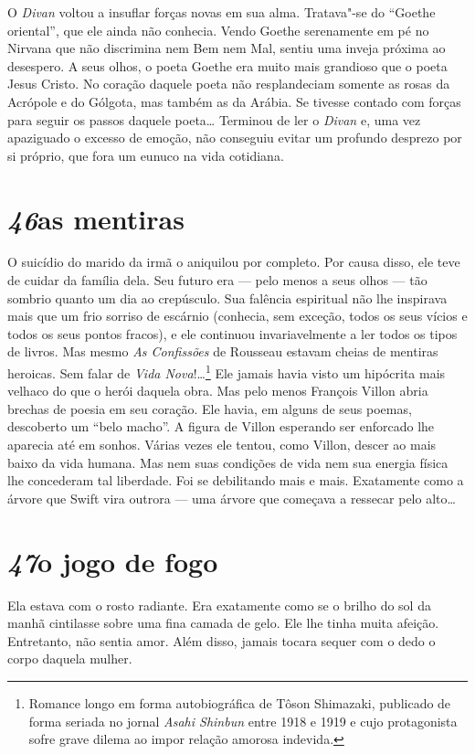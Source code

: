 O \textit{Divan} voltou a insuflar forças novas em sua alma. Tratava"-se
do ``Goethe oriental'', que ele ainda não conhecia. Vendo Goethe
serenamente em pé no Nirvana que não discrimina nem Bem nem Mal, sentiu
uma inveja próxima ao desespero. A seus olhos, o poeta Goethe era muito
mais grandioso que o poeta Jesus Cristo. No coração daquele poeta não
resplandeciam somente as rosas da Acrópole e do Gólgota, mas também as
da Arábia. Se tivesse contado com forças para seguir os passos daquele
poeta\ldots{} Terminou de ler o \textit{Divan} e, uma vez apaziguado o
excesso de emoção, não conseguiu evitar um profundo desprezo por si
próprio, que fora um eunuco na vida cotidiana.

\section*{\textit{46}\es as mentiras}

O suicídio do marido da irmã o aniquilou por completo. Por causa disso,
ele teve de cuidar da família dela. Seu futuro era --- pelo menos a seus
olhos --- tão sombrio quanto um dia ao crepúsculo. Sua falência
espiritual não lhe inspirava mais que um frio sorriso de escárnio
(conhecia, sem exceção, todos os seus vícios e todos os seus pontos
fracos), e ele continuou invariavelmente a ler todos os tipos de
livros. Mas mesmo \textit{As Confissões} de Rousseau estavam cheias de
mentiras heroicas. Sem falar de \textit{Vida Nova}!\ldots{}\footnote{ Romance
longo em forma autobiográfica de Tôson Shimazaki, publicado de forma
seriada no jornal \textit{Asahi Shinbun} entre 1918 e 1919 e cujo
protagonista sofre grave dilema ao impor relação amorosa indevida.} 
Ele jamais havia visto um hipócrita mais velhaco do que o herói daquela
obra. Mas pelo menos François Villon abria brechas de poesia em seu
coração. Ele havia, em alguns de seus poemas, descoberto um ``belo
macho''. A figura de Villon esperando ser enforcado lhe aparecia até em
sonhos. Várias vezes ele tentou, como Villon, descer ao mais baixo da
vida humana. Mas nem suas condições de vida nem sua energia física lhe
concederam tal liberdade. Foi se debilitando mais e mais. Exatamente
como a árvore que Swift vira outrora --- uma árvore que começava a
ressecar pelo alto\ldots{}

\section*{\textit{47}\es o jogo de fogo}

Ela estava com o rosto radiante. Era exatamente como se o brilho do sol
da manhã cintilasse sobre uma fina camada de gelo. Ele lhe tinha muita
afeição. Entretanto, não sentia amor. Além disso, jamais tocara sequer
com o dedo o corpo daquela mulher.

